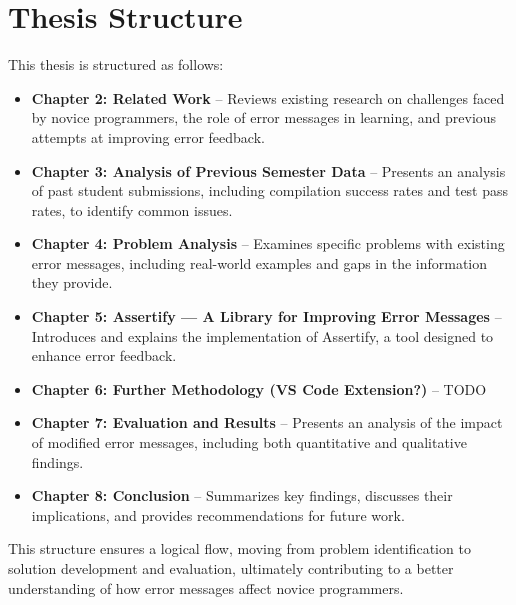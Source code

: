 \section{Thesis Structure} %




This thesis is structured as follows:
\begin{itemize}
    \item \textbf{Chapter 2: Related Work} -- Reviews existing research on challenges faced by novice programmers, the role of error messages in learning, and previous attempts at improving error feedback.
    \item \textbf{Chapter 3: Analysis of Previous Semester Data} -- Presents an analysis of past student submissions, including compilation success rates and test pass rates, to identify common issues.
    \item \textbf{Chapter 4: Problem Analysis} -- Examines specific problems with existing error messages, including real-world examples and gaps in the information they provide.
    \item \textbf{Chapter 5: Assertify --- A Library for Improving Error Messages} -- Introduces and explains the implementation of Assertify, a tool designed to enhance error feedback.
    \item \textbf{Chapter 6: Further Methodology (VS Code Extension?)} -- TODO
    \item \textbf{Chapter 7: Evaluation and Results} -- Presents an analysis of the impact of modified error messages, including both quantitative and qualitative findings.
    \item \textbf{Chapter 8: Conclusion} -- Summarizes key findings, discusses their implications, and provides recommendations for future work.
\end{itemize}
This structure ensures a logical flow, moving from problem identification to solution development and evaluation, ultimately contributing to a better understanding of how error messages affect novice programmers.



